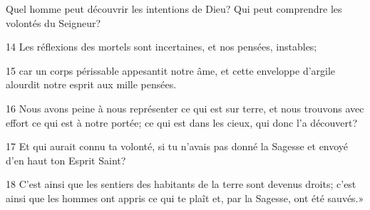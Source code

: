 Quel homme peut découvrir les intentions de Dieu? Qui peut comprendre les volontés du Seigneur?

14 Les réflexions des mortels sont incertaines, et nos pensées, instables;

15 car un corps périssable appesantit notre âme, et cette enveloppe d’argile alourdit notre esprit aux mille pensées.

16 Nous avons peine à nous représenter ce qui est sur terre, et nous trouvons avec effort ce qui est à notre portée; ce qui est dans les cieux, qui donc l’a découvert?

17 Et qui aurait connu ta volonté, si tu n’avais pas donné la Sagesse et envoyé d’en haut ton Esprit Saint?

18 C’est ainsi que les sentiers des habitants de la terre sont devenus droits; c’est ainsi que les hommes ont appris ce qui te plaît et, par la Sagesse, ont été sauvés.»